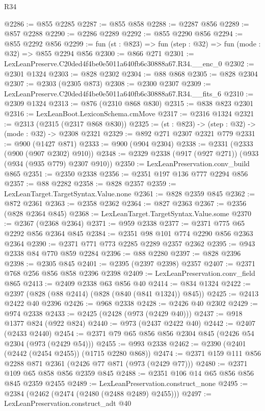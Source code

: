 \begin{lexlean}{R34}
\begin{coremodule}
@2286 := @855 @2285
@2287 := @855 @858
@2288 := @2287 @856
@2289 := @857 @2288
@2290 := @2286 @2289
@2292 := @855 @2290 @856
@2294 := @855 @2292 @856
@2299 := fun (st : @823) => fun (step : @32) => fun (mode : @32) => @855 @2294 @856
@2300 := @866 @271
@2301 := LexLeanPreserve.C20ded4f4be0e5011a640fb6c30888a67.R34.__enc_0
@2302 := @2301 @1324
@2303 := @828 @2302
@2304 := @88 @868
@2305 := @828 @2304
@2307 := @2303 (@2305 @873)
@2308 := @2300 @2307
@2309 := LexLeanPreserve.C20ded4f4be0e5011a640fb6c30888a67.R34.__fits_6
@2310 := @2309 @1324
@2313 := @876 (@2310 @868 @830)
@2315 := @838 @823 @2301
@2316 := LexLeanBoot.LexiconSchema.cmMove
@2317 := @2316 @1324
@2321 := @2313 (@2315 (@2317 @868 @830))
@2325 := (st : @823) -> (step : @32) -> (mode : @32) -> @2308 @2321
@2329 := @892 @271 @2307 @2321 @779
@2331 := @900 (@1427 @871)
@2333 := @900 (@904 @2304)
@2338 := @2331 (@2333 (@900 (@907 @2302) @910))
@2348 := @2329 @2338 (@917 (@927 @271)) (@933 (@934 (@935 @779) @2307 @910))
@2350 := LexLeanPreservation.conv_build @865
@2351 := @2350 @2338
@2356 := @2351 @197 @136 @777 @2294 @856
@2357 := @88 @2282
@2358 := @828 @2357
@2359 := LexLeanTarget.TargetSyntax.Value.none
@2361 := @828 @2359 @845
@2362 := @872 @2361
@2363 := @2358 @2362
@2364 := @827 @2363
@2367 := @2356 (@828 @2364 @845)
@2368 := LexLeanTarget.TargetSyntax.Value.some
@2370 := @2367 (@2368 @2364)
@2371 := @959 @2338
@2377 := @2371 @775 @65 @2292 @856 @2364 @845
@2384 := @2351 @98 @101 @774 @2290 @856 @2363 @2364
@2390 := @2371 @771 @773 @2285 @2289 @2357 @2362
@2395 := @943 @2338 @84 @770 @859 @2284
@2396 := @88 @2280
@2397 := @828 @2396
@2398 := @2305 @845
@2401 := @2395 (@2397 @2398) @2357
@2407 := @2371 @768 @256 @856 @858 @2396 @2398
@2409 := LexLeanPreservation.conv_field @865
@2413 := @2409 @2338 @63 @856 @40
@2414 := @834 @1324
@2422 := @2397 (@828 (@88 @2414) (@828 (@840 (@841 @1324)) @845))
@2425 := @2413 @2422 @40 @2396
@2426 := @968 @2338
@2428 := @2426 @40 @2302
@2429 := @974 @2338
@2433 := @2425 (@2428 (@973 (@2429 @40)))
@2437 := @918 @1377 @824 (@922 @824)
@2440 := @973 (@2437 @2422 @40)
@2442 := @2407 (@2433 @2440)
@2454 := @2371 @79 @65 @856 @856 @2304 @845 (@2426 @54 @2304 (@973 (@2429 @54)))
@2455 := @993 @2338
@2462 := @2390 (@2401 (@2442 (@2454 @2455)) (@1715 @2280 @868))
@2474 := @2371 @159 @111 @856 @2288 @871 @2361 (@2426 @77 @871 (@973 (@2429 @77)))
@2480 := @2371 @109 @65 @858 @856 @2359 @845
@2488 := @2351 @106 @14 @65 @856 @856 @845 @2359 @2455
@2489 := LexLeanPreservation.construct_none
@2495 := @2384 (@2462 (@2474 (@2480 (@2488 @2489) @2455)))
@2497 := LexLeanPreservation.construct_adt @40

\end{coremodule}
\end{lexlean}
